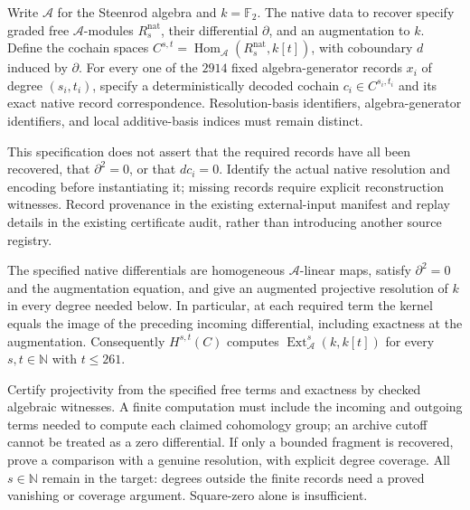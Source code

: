 \begin{definition}
  \label{def:lin-native-representative-specification}
  \notready
  Write $\mathcal A$ for the Steenrod algebra and $k=\mathbb F_2$.
  The native data to recover specify graded free $\mathcal A$-modules
  $R^{\mathrm{nat}}_s$, their differential $\partial$, and an augmentation
  to $k$. Define the cochain spaces
  $C^{s,t}=\operatorname{Hom}_{\mathcal A}
    (R^{\mathrm{nat}}_s,k[t])$, with coboundary $d$ induced by $\partial$.
  For every one of the $2914$ fixed algebra-generator records $x_i$ of
  degree $(s_i,t_i)$, specify a deterministically decoded cochain
  $c_i\in C^{s_i,t_i}$ and its exact native record correspondence.
  Resolution-basis identifiers, algebra-generator identifiers, and local
  additive-basis indices must remain distinct.

  This specification does not assert that the required records have all
  been recovered, that $\partial^2=0$, or that $dc_i=0$. Identify the actual
  native resolution and encoding before instantiating it; missing records
  require explicit reconstruction witnesses. Record provenance in the
  existing external-input manifest and replay details in the existing
  certificate audit, rather than introducing another source registry.
\end{definition}

\begin{proposition}
  \label{prop:lin-native-resolution-correct}
  \notready
  The specified native differentials are homogeneous $\mathcal A$-linear
  maps, satisfy $\partial^2=0$ and the augmentation equation, and give an
  augmented projective resolution of $k$ in every degree needed below.
  In particular, at each required term the kernel equals the image of the
  preceding incoming differential, including exactness at the augmentation.
  Consequently $H^{s,t}(C)$ computes
  $\operatorname{Ext}_{\mathcal A}^s(k,k[t])$ for every $s,t\in\mathbb N$
  with $t\le261$.

  Certify projectivity from the specified free terms and exactness by
  checked algebraic witnesses. A finite computation must include the
  incoming and outgoing terms needed to compute each claimed cohomology
  group; an archive cutoff cannot be treated as a zero differential.
  If only a bounded fragment is recovered, prove a comparison with a
  genuine resolution, with explicit degree coverage. All $s\in\mathbb N$
  remain in the target: degrees outside the finite records need a proved
  vanishing or coverage argument. Square-zero alone is insufficient.
\end{proposition}

